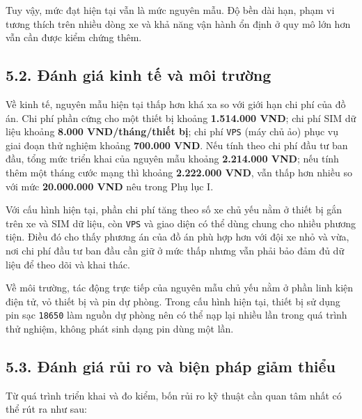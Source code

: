 \documentclass[a4paper]{extarticle}
\begin{document}
Tuy vậy, mức đạt hiện tại vẫn là mức nguyên mẫu. Độ bền dài hạn, phạm vi tương thích trên nhiều dòng xe và khả năng vận hành ổn định ở quy mô lớn hơn vẫn cần được kiểm chứng thêm.

\subsection{5.2. Đánh giá kinh tế và môi trường}\label{ux111uxe1nh-giuxe1-kinh-tux1ebf-vuxe0-muxf4i-trux1b0ux1eddng}

Về kinh tế, nguyên mẫu hiện tại thấp hơn khá xa so với giới hạn chi phí của đồ án. Chi phí phần cứng cho một thiết bị khoảng \textbf{1.514.000 VND}; chi phí SIM dữ liệu khoảng \textbf{8.000 VND/tháng/thiết bị}; chi phí \texttt{VPS} (máy chủ ảo) phục vụ giai đoạn thử nghiệm khoảng \textbf{700.000 VND}. Nếu tính theo chi phí đầu tư ban đầu, tổng mức triển khai của nguyên mẫu khoảng \textbf{2.214.000 VND}; nếu tính thêm một tháng cước mạng thì khoảng \textbf{2.222.000 VND}, vẫn thấp hơn nhiều so với mức \textbf{20.000.000 VND} nêu trong Phụ lục I.

Với cấu hình hiện tại, phần chi phí tăng theo số xe chủ yếu nằm ở thiết bị gắn trên xe và SIM dữ liệu, còn \texttt{VPS} và giao diện có thể dùng chung cho nhiều phương tiện. Điều đó cho thấy phương án của đồ án phù hợp hơn với đội xe nhỏ và vừa, nơi chi phí đầu tư ban đầu cần giữ ở mức thấp nhưng vẫn phải bảo đảm đủ dữ liệu để theo dõi và khai thác.

Về môi trường, tác động trực tiếp của nguyên mẫu chủ yếu nằm ở phần linh kiện điện tử, vỏ thiết bị và pin dự phòng. Trong cấu hình hiện tại, thiết bị sử dụng pin sạc \texttt{18650} làm nguồn dự phòng nên có thể nạp lại nhiều lần trong quá trình thử nghiệm, không phát sinh dạng pin dùng một lần.

\subsection{5.3. Đánh giá rủi ro và biện pháp giảm thiểu}\label{ux111uxe1nh-giuxe1-rux1ee7i-ro-vuxe0-biux1ec7n-phuxe1p-giux1ea3m-thiux1ec3u}

Từ quá trình triển khai và đo kiểm, bốn rủi ro kỹ thuật cần quan tâm nhất có thể rút ra như sau:
\end{document}
